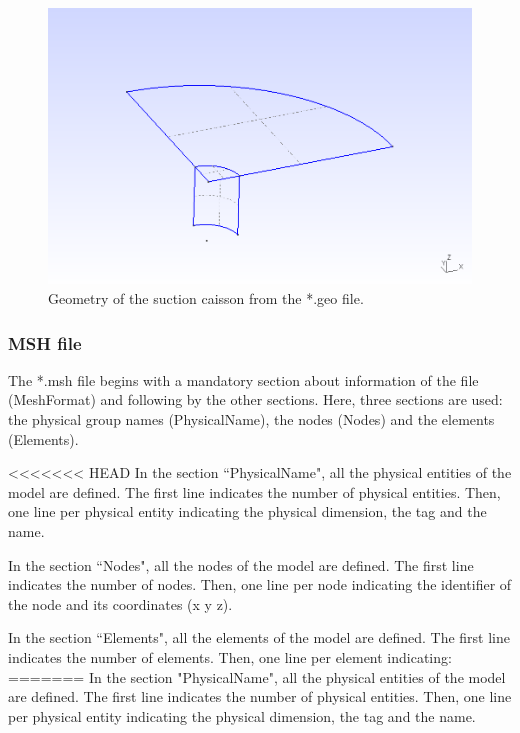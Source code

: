 \documentclass[a4]{article}
\begin{document}
\begin{figure}[tbh!]
	\centering
	\includegraphics[scale=0.6]{geometry_geo.png}
	\caption{Geometry of the suction caisson from the *.geo file.}
	\label{fig:geometry_geo}
\end{figure}

\subsubsection{MSH file}

The *.msh file begins with a mandatory section about information of the file (MeshFormat) and following by the other sections. Here, three sections are used: the physical group names (PhysicalName), the nodes (Nodes) and the elements (Elements).

<<<<<<< HEAD
In the section ``PhysicalName", all the physical entities of the model are defined. The first line indicates the number of physical entities. Then, one line per physical entity indicating the physical dimension, the tag and the name.  

In the section ``Nodes", all the nodes of the model are defined. The first line indicates the number of nodes. Then, one line per node indicating the identifier of the node and its coordinates (x y z).

In the section ``Elements", all the elements of the model are defined. The first line indicates the number of elements. Then, one line per element indicating:
=======
In the section "PhysicalName", all the physical entities of the model are defined. The first line indicates the number of physical entities. Then, one line per physical entity indicating the physical dimension, the tag and the name.  
\end{document}
